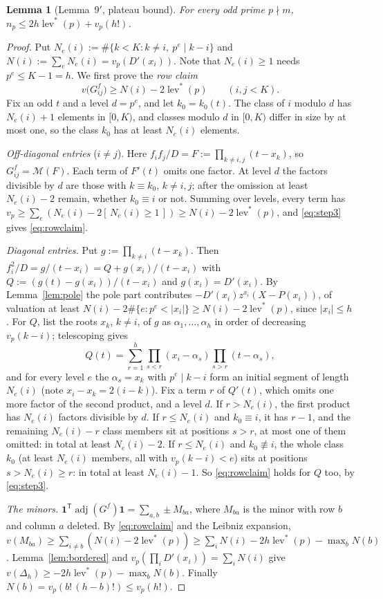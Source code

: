 \documentclass[11pt]{amsart}
\newtheorem{lemma}[theorem]{Lemma}
\theoremstyle{definition}
\theoremstyle{remark}
\numberwithin{equation}{section}
\newcommand{\cM}{\mathcal{M}}
\newcommand{\one}{\mathbf{1}}
\newcommand{\ind}[1]{[\,#1\,]}
\newcommand{\lev}{\operatorname{lev}^{*}}
\newcommand{\adj}{\operatorname{adj}}
\begin{document}
\begin{lemma}[Lemma~9$'$, plateau bound]\label{lem:nine}
For every odd prime $p\nmid m$, $n_p\le2h\lev(p)+v_p(h!)$.
\end{lemma}

\begin{proof}
Put $N_e(i):=\#\{k<K:k\ne i,\ p^e\mid k-i\}$ and $N(i):=\sum_eN_e(i)=v_p(D'(x_i))$. Note that $N_e(i)\ge1$ needs
$p^e\le K-1=h$. We first prove the \emph{row claim}
\begin{equation}\label{eq:rowclaim}
  v\bigl(G^f_{ij}\bigr)\ge N(i)-2\lev(p)\qquad(i,j<K).
\end{equation}
Fix an odd $t$ and a level $d=p^e$, and let $k_0=k_0(t)$. The class of $i$ modulo $d$ has $N_e(i)+1$ elements in
$[0,K)$, and classes modulo $d$ in $[0,K)$ differ in size by at most one, so the class $k_0$ has at least $N_e(i)$
elements.

\emph{Off-diagonal entries} ($i\ne j$). Here $f_if_j/D=F:=\prod_{k\ne i,j}(t-x_k)$, so $G^f_{ij}=\cM(F)$. Each term of
$F'(t)$ omits one factor. At level $d$ the factors divisible by $d$ are those with $k\equiv k_0$, $k\ne i,j$; after the
omission at least $N_e(i)-2$ remain, whether $k_0\equiv i$ or not. Summing over levels, every term has $v_p\ge
\sum_e(N_e(i)-2\ind{N_e(i)\ge1})\ge N(i)-2\lev(p)$, and \eqref{eq:step3} gives \eqref{eq:rowclaim}.

\emph{Diagonal entries.} Put $g:=\prod_{k\ne i}(t-x_k)$. Then $f_i^2/D=g/(t-x_i)=Q+g(x_i)/(t-x_i)$ with
$Q:=(g(t)-g(x_i))/(t-x_i)$ and $g(x_i)=D'(x_i)$. By Lemma~\ref{lem:pole} the pole part contributes
$-D'(x_i)z^{x_i}(X-P(x_i))$, of valuation at least $N(i)-2\#\{e:p^e<|x_i|\}\ge N(i)-2\lev(p)$, since $|x_i|\le h$. For
$Q$, list the roots $x_k$, $k\ne i$, of $g$ as $\alpha_1,\dots,\alpha_h$ in order of decreasing $v_p(k-i)$; telescoping
gives
\[
  Q(t)=\sum_{r=1}^{h}\prod_{s<r}(x_i-\alpha_s)\prod_{s>r}(t-\alpha_s),
\]
and for every level $e$ the $\alpha_s=x_k$ with $p^e\mid k-i$ form an initial segment of length $N_e(i)$ (note
$x_i-x_k=2(i-k)$). Fix a term $r$ of $Q'(t)$, which omits one more factor of the second product, and a level $d$. If
$r>N_e(i)$, the first product has $N_e(i)$ factors divisible by $d$. If $r\le N_e(i)$ and $k_0\equiv i$, it has $r-1$,
and the remaining $N_e(i)-r$ class members sit at positions $s>r$, at most one of them omitted: in total at least
$N_e(i)-2$. If $r\le N_e(i)$ and $k_0\not\equiv i$, the whole class $k_0$ (at least $N_e(i)$ members, all with
$v_p(k-i)<e$) sits at positions $s>N_e(i)\ge r$: in total at least $N_e(i)-1$. So \eqref{eq:rowclaim} holds for $Q$
too, by \eqref{eq:step3}.

\emph{The minors.} $\one^{\mathsf T}\adj(G^f)\one=\sum_{a,b}\pm M_{ba}$, where $M_{ba}$ is the minor with row $b$ and
column $a$ deleted. By \eqref{eq:rowclaim} and the Leibniz expansion, $v(M_{ba})\ge\sum_{i\ne b}(N(i)-2\lev(p))\ge
\sum_iN(i)-2h\lev(p)-\max_bN(b)$. Lemma~\ref{lem:bordered} and $v_p(\prod_iD'(x_i))=\sum_iN(i)$ give
$v(\Delta_h)\ge-2h\lev(p)-\max_bN(b)$. Finally $N(b)=v_p(b!\,(h-b)!)\le v_p(h!)$.
\end{proof}
\end{document}
